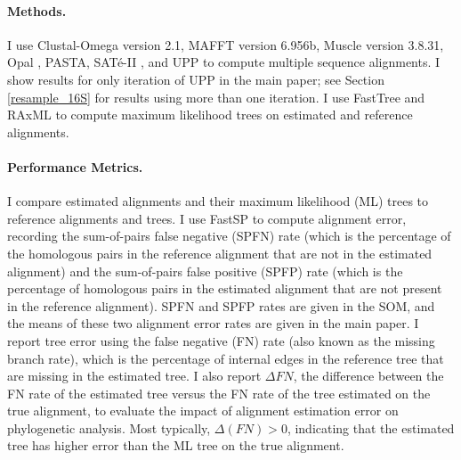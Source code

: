 \paragraph{Methods. }
I use 
Clustal-Omega \cite{Sievers2011} version 2.1, 
MAFFT \cite{Katoh2005,Katoh2007} version 6.956b,
Muscle \cite{Edgar2004} version 3.8.31, 
Opal \cite{Wheeler2007}, %
PASTA, %
SAT\'e-II \cite{Liu2012}, %
and UPP to compute multiple sequence alignments.
I show results for only
iteration of UPP in the main paper; see Section \ref{resample_16S}
for results using more than one iteration.
I use FastTree \cite{Price2010} and RAxML \cite{Stamatakis2014} 
to compute maximum
likelihood trees on estimated and reference alignments.



\paragraph{Performance Metrics.}
I compare estimated alignments and their maximum
likelihood (ML) trees to reference 
alignments and trees.
I use FastSP \cite{fastsp} to 
compute
alignment error, recording
 the sum-of-pairs false 
negative (SPFN) rate (which is the percentage of the
homologous pairs in the reference alignment that
are not in the estimated alignment) and the
sum-of-pairs false positive (SPFP) rate
(which is the
percentage of homologous 
pairs in the estimated alignment that are not present in the reference alignment).
SPFN and SPFP rates are given in the SOM, and the means
of these two
alignment error rates are given in the main paper.
I report tree error using the false negative (FN) rate (also
known as the missing branch rate), which is 
the percentage of internal edges in the reference tree that 
are missing in the estimated tree.
I also report $\Delta{FN}$, the difference between 
the FN rate of the estimated tree versus the FN 
rate of the tree estimated on the true alignment, to 
evaluate the impact of alignment estimation error on
phylogenetic analysis.
Most typically, $\Delta(FN)>0$, indicating that the estimated tree
has higher error than the ML tree on the true alignment.



